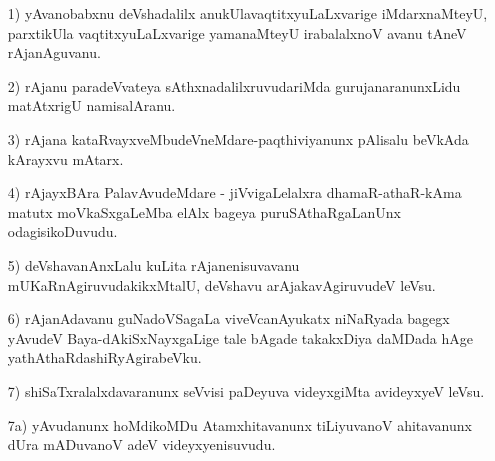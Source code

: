\begin{itemize}

\item [1)] yAvanobabxnu deVshadalilx anukUlavaqtitxyuLaLxvarige iMdarxnaMteyU, parxtikUla vaqtitxyuLaLxvarige yamanaMteyU irabalalxnoV avanu tAneV rAjanAguvanu.
\item [2)] rAjanu paradeVvateya sAthxnadalilxruvudariMda gurujanaranunxLidu matAtxrigU namisalAranu.
\item [3)] rAjana kataRvayxveMbudeVneMdare-paqthiviyanunx pAlisalu beVkAda kArayxvu mAtarx.
\item [4)] rAjayxBAra PalavAvudeMdare - jiVvigaLelalxra dhamaR-athaR-kAma matutx moVkaSxgaLeMba elAlx bageya puruSAthaRgaLanUnx odagisikoDuvudu.
\item [5)] deVshavanAnxLalu kuLita rAjanenisuvavanu mUKaRnAgiruvudakikxMtalU, deVshavu arAjakavAgiruvudeV leVsu.
\item [6)] rAjanAdavanu guNadoVSagaLa viveVcanAyukatx niNaRyada bagegx yAvudeV Baya-dAkiSxNayxgaLige tale bAgade takakxDiya daMDada hAge yathAthaRdashiRyAgirabeVku.
\item [7)] shiSaTxralalxdavaranunx seVvisi paDeyuva videyxgiMta avideyxyeV leVsu.
\item [7a)] yAvudanunx hoMdikoMDu Atamxhitavanunx tiLiyuvanoV ahitavanunx dUra mADuvanoV adeV videyxyenisuvudu.


\end{itemize}
